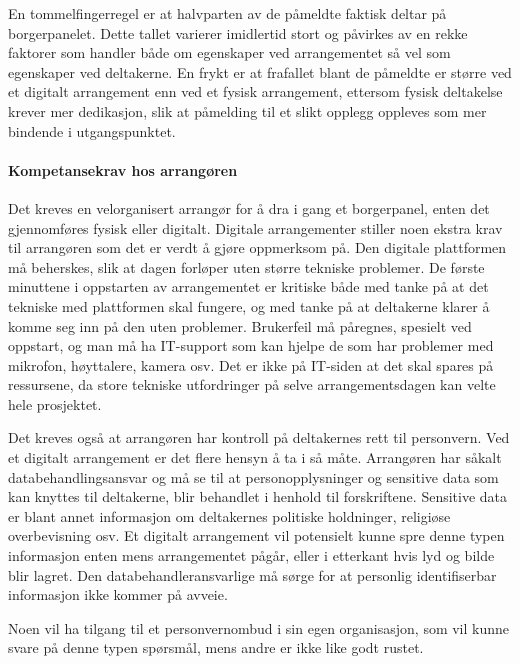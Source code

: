 \documentclass[
  12pt,
  a4paper, 12pt]{article}
\begin{document}
En tommelfingerregel er at halvparten av de påmeldte faktisk deltar på borgerpanelet. Dette tallet varierer imidlertid stort og påvirkes av en rekke faktorer som handler både om egenskaper ved arrangementet så vel som egenskaper ved deltakerne. En frykt er at frafallet blant de påmeldte er større ved et digitalt arrangement enn ved et fysisk arrangement, ettersom fysisk deltakelse krever mer dedikasjon, slik at påmelding til et slikt opplegg oppleves som mer bindende i utgangspunktet.

\hypertarget{kompetansekrav-hos-arranguxf8ren}{%
\paragraph{Kompetansekrav hos arrangøren}\label{kompetansekrav-hos-arranguxf8ren}}

Det kreves en velorganisert arrangør for å dra i gang et borgerpanel, enten det gjennomføres fysisk eller digitalt. Digitale arrangementer stiller noen ekstra krav til arrangøren som det er verdt å gjøre oppmerksom på. Den digitale plattformen må beherskes, slik at dagen forløper uten større tekniske problemer. De første minuttene i oppstarten av arrangementet er kritiske både med tanke på at det tekniske med plattformen skal fungere, og med tanke på at deltakerne klarer å komme seg inn på den uten problemer. Brukerfeil må påregnes, spesielt ved oppstart, og man må ha IT-support som kan hjelpe de som har problemer med mikrofon, høyttalere, kamera osv. Det er ikke på IT-siden at det skal spares på ressursene, da store tekniske utfordringer på selve arrangementsdagen kan velte hele prosjektet.

Det kreves også at arrangøren har kontroll på deltakernes rett til personvern. Ved et digitalt arrangement er det flere hensyn å ta i så måte. Arrangøren har såkalt databehandlingsansvar og må se til at personopplysninger og sensitive data som kan knyttes til deltakerne, blir behandlet i henhold til forskriftene. Sensitive data er blant annet informasjon om deltakernes politiske holdninger, religiøse overbevisning osv. Et digitalt arrangement vil potensielt kunne spre denne typen informasjon enten mens arrangementet pågår, eller i etterkant hvis lyd og bilde blir lagret. Den databehandleransvarlige må sørge for at personlig identifiserbar informasjon ikke kommer på avveie.

Noen vil ha tilgang til et personvernombud i sin egen organisasjon, som vil kunne svare på denne typen spørsmål, mens andre er ikke like godt rustet.
\end{document}
